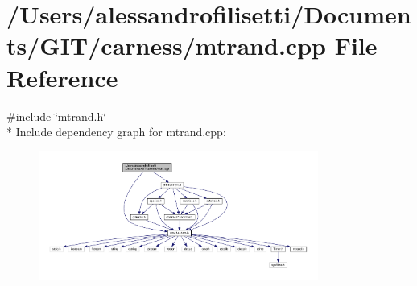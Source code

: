 \hypertarget{a00071}{\section{/\-Users/alessandrofilisetti/\-Documents/\-G\-I\-T/carness/mtrand.cpp File Reference}
\label{a00071}
}
{\ttfamily \#include \char`\"{}mtrand.\-h\char`\"{}}\\*
Include dependency graph for mtrand.\-cpp\-:
\nopagebreak
\begin{figure}[H]
\begin{center}
\leavevmode
\includegraphics[width=260pt]{a00191}
\end{center}
\end{figure}
